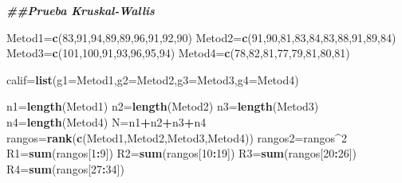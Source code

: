 \documentclass[
  a4paper,
  oneside,
  openany]{book}
\newenvironment{Shaded}{\begin{snugshade}}{\end{snugshade}}
\newcommand{\AttributeTok}[1]{\textcolor[rgb]{0.13,0.29,0.53}{#1}}
\newcommand{\DecValTok}[1]{\textcolor[rgb]{0.00,0.00,0.81}{#1}}
\newcommand{\DocumentationTok}[1]{\textcolor[rgb]{0.56,0.35,0.01}{\textbf{\textit{#1}}}}
\newcommand{\FunctionTok}[1]{\textcolor[rgb]{0.13,0.29,0.53}{\textbf{#1}}}
\newcommand{\NormalTok}[1]{#1}
\newcommand{\OtherTok}[1]{\textcolor[rgb]{0.56,0.35,0.01}{#1}}
\newcommand{\SpecialCharTok}[1]{\textcolor[rgb]{0.81,0.36,0.00}{\textbf{#1}}}
\begin{document}
\begin{Shaded}
\begin{Highlighting}[]
\DocumentationTok{\#\#Prueba Kruskal{-}Wallis}

\NormalTok{Metod1}\OtherTok{=}\FunctionTok{c}\NormalTok{(}\DecValTok{83}\NormalTok{,}\DecValTok{91}\NormalTok{,}\DecValTok{94}\NormalTok{,}\DecValTok{89}\NormalTok{,}\DecValTok{89}\NormalTok{,}\DecValTok{96}\NormalTok{,}\DecValTok{91}\NormalTok{,}\DecValTok{92}\NormalTok{,}\DecValTok{90}\NormalTok{)    }
\NormalTok{Metod2}\OtherTok{=}\FunctionTok{c}\NormalTok{(}\DecValTok{91}\NormalTok{,}\DecValTok{90}\NormalTok{,}\DecValTok{81}\NormalTok{,}\DecValTok{83}\NormalTok{,}\DecValTok{84}\NormalTok{,}\DecValTok{83}\NormalTok{,}\DecValTok{88}\NormalTok{,}\DecValTok{91}\NormalTok{,}\DecValTok{89}\NormalTok{,}\DecValTok{84}\NormalTok{)}
\NormalTok{Metod3}\OtherTok{=}\FunctionTok{c}\NormalTok{(}\DecValTok{101}\NormalTok{,}\DecValTok{100}\NormalTok{,}\DecValTok{91}\NormalTok{,}\DecValTok{93}\NormalTok{,}\DecValTok{96}\NormalTok{,}\DecValTok{95}\NormalTok{,}\DecValTok{94}\NormalTok{)        }
\NormalTok{Metod4}\OtherTok{=}\FunctionTok{c}\NormalTok{(}\DecValTok{78}\NormalTok{,}\DecValTok{82}\NormalTok{,}\DecValTok{81}\NormalTok{,}\DecValTok{77}\NormalTok{,}\DecValTok{79}\NormalTok{,}\DecValTok{81}\NormalTok{,}\DecValTok{80}\NormalTok{,}\DecValTok{81}\NormalTok{)}

\NormalTok{calif}\OtherTok{=}\FunctionTok{list}\NormalTok{(}\AttributeTok{g1=}\NormalTok{Metod1,}\AttributeTok{g2=}\NormalTok{Metod2,}\AttributeTok{g3=}\NormalTok{Metod3,}\AttributeTok{g4=}\NormalTok{Metod4)}

\NormalTok{n1}\OtherTok{=}\FunctionTok{length}\NormalTok{(Metod1)}
\NormalTok{n2}\OtherTok{=}\FunctionTok{length}\NormalTok{(Metod2)}
\NormalTok{n3}\OtherTok{=}\FunctionTok{length}\NormalTok{(Metod3)}
\NormalTok{n4}\OtherTok{=}\FunctionTok{length}\NormalTok{(Metod4)}
\NormalTok{N}\OtherTok{=}\NormalTok{n1}\SpecialCharTok{+}\NormalTok{n2}\SpecialCharTok{+}\NormalTok{n3}\SpecialCharTok{+}\NormalTok{n4}
\NormalTok{rangos}\OtherTok{=}\FunctionTok{rank}\NormalTok{(}\FunctionTok{c}\NormalTok{(Metod1,Metod2,Metod3,Metod4))}
\NormalTok{rangos2}\OtherTok{=}\NormalTok{rangos}\SpecialCharTok{\^{}}\DecValTok{2}
\NormalTok{R1}\OtherTok{=}\FunctionTok{sum}\NormalTok{(rangos[}\DecValTok{1}\SpecialCharTok{:}\DecValTok{9}\NormalTok{])}
\NormalTok{R2}\OtherTok{=}\FunctionTok{sum}\NormalTok{(rangos[}\DecValTok{10}\SpecialCharTok{:}\DecValTok{19}\NormalTok{])}
\NormalTok{R3}\OtherTok{=}\FunctionTok{sum}\NormalTok{(rangos[}\DecValTok{20}\SpecialCharTok{:}\DecValTok{26}\NormalTok{])}
\NormalTok{R4}\OtherTok{=}\FunctionTok{sum}\NormalTok{(rangos[}\DecValTok{27}\SpecialCharTok{:}\DecValTok{34}\NormalTok{])}


\end{Highlighting}
\end{Shaded}
\end{document}
